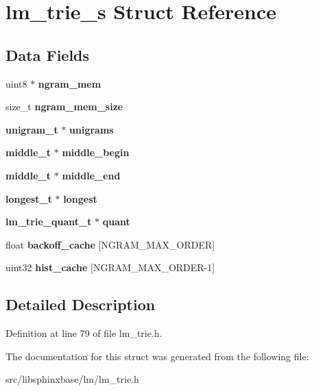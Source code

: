\section{lm\-\_\-trie\-\_\-s Struct Reference}
\label{structlm__trie__s}
\subsection*{Data Fields}
\begin{DoxyCompactItemize}
\item 
uint8 $\ast$ {\bfseries ngram\-\_\-mem}\label{structlm__trie__s_a58167a5c232538cebd3e083a097a9a1b}

\item 
size\-\_\-t {\bfseries ngram\-\_\-mem\-\_\-size}\label{structlm__trie__s_af256466f3eff8c3b665f10200815ba1d}

\item 
{\bf unigram\-\_\-t} $\ast$ {\bfseries unigrams}\label{structlm__trie__s_a22667bd186be6bf3804a3a597c96bd93}

\item 
{\bf middle\-\_\-t} $\ast$ {\bfseries middle\-\_\-begin}\label{structlm__trie__s_aa4a224213e7c1f5fcdb8b15169c237de}

\item 
{\bf middle\-\_\-t} $\ast$ {\bfseries middle\-\_\-end}\label{structlm__trie__s_a7f39ce792b398ba89e5db14a895189e9}

\item 
{\bf longest\-\_\-t} $\ast$ {\bfseries longest}\label{structlm__trie__s_ade570f476da0d4fb1d865a7eb4285a3b}

\item 
{\bf lm\-\_\-trie\-\_\-quant\-\_\-t} $\ast$ {\bfseries quant}\label{structlm__trie__s_a0a25fcb4269d21eba7596524b4f39bbd}

\item 
float {\bfseries backoff\-\_\-cache} [N\-G\-R\-A\-M\-\_\-\-M\-A\-X\-\_\-\-O\-R\-D\-E\-R]\label{structlm__trie__s_a8e77be0a2f9072567efdaccdcae578e3}

\item 
uint32 {\bfseries hist\-\_\-cache} [N\-G\-R\-A\-M\-\_\-\-M\-A\-X\-\_\-\-O\-R\-D\-E\-R-\/1]\label{structlm__trie__s_ac16d0621ba597c96e2e3ee0f29d1aa16}

\end{DoxyCompactItemize}


\subsection{Detailed Description}


Definition at line 79 of file lm\-\_\-trie.\-h.



The documentation for this struct was generated from the following file\-:\begin{DoxyCompactItemize}
\item 
src/libsphinxbase/lm/lm\-\_\-trie.\-h\end{DoxyCompactItemize}
